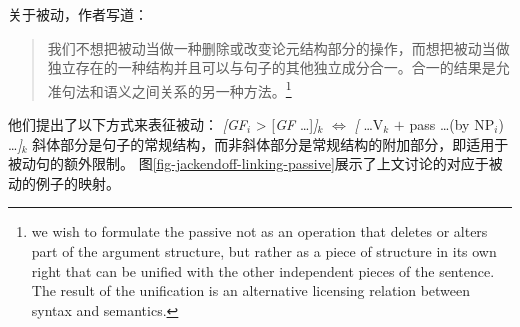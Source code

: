 \begin{exe}
\begin{xlist}[iv.]
\begin{exe}
\begin{xlist}[iv.]

关于被动，作者写道：

\begin{quotation}
我们不想把被动当做一种删除或改变论元结构部分的操作，而想把被动当做独立存在的一种结构并且可以与句子的其他独立成分合一。合一的结果是允准句法和语义之间关系的另一种方法。\citep[]{CJ2005a}\footnote{%
we wish to formulate the passive not as an operation that deletes or alters part of the argument
structure, but rather as a piece of structure in its own right that can be unified with the other
independent pieces of the sentence. The result of the unification is an alternative licensing
relation between syntax and semantics.
}
\end{quotation}
他们提出了以下方式来表征被动：
\ea
\label{constraint-CJ-passive}
{}\emph{[GF}$_i$ > [\emph{GF} \ldots]\emph{]}$_k$ $\Leftrightarrow$ \emph{[} \ldots V$_k$ $+$ pass \ldots (by NP$_i$) \ldots \emph{]}$_k$
\z
斜体部分是句子的常规结构，而非斜体部分是常规结构的附加部分，即适用于被动句的额外限制。
图\ref{fig-jackendoff-linking-passive}展示了上文讨论的对应于被动的例子的映射。


\end{xlist}
\end{exe}
\end{xlist}
\end{exe}
